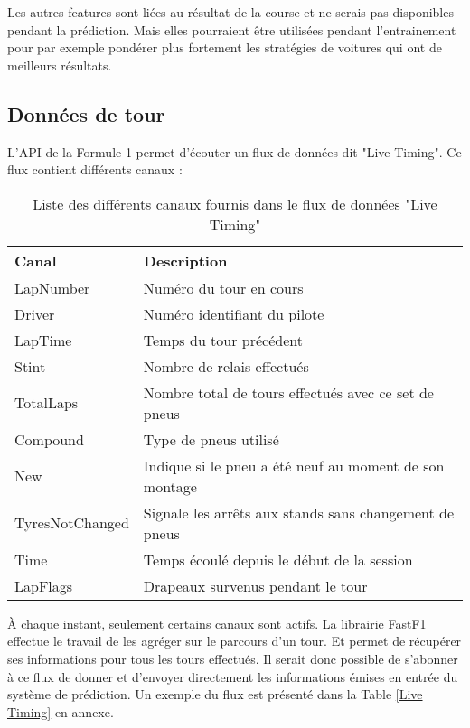 Les autres features sont liées au résultat de la course et ne serais pas disponibles pendant la prédiction.
Mais elles pourraient être utilisées pendant l'entrainement pour par exemple pondérer plus fortement
les stratégies de voitures qui ont de meilleurs résultats.
\subsection{Données de tour}
L'API de la Formule 1 permet d'écouter un flux de données dit "Live Timing".
Ce flux contient différents canaux :
\begin{table}[H]
    \begin{center}
        \caption{Liste des différents canaux fournis dans le flux de données "Live Timing" \cite{fastf1documentation}}
        \begin{tabular}{l|l}
            Canal           & Description                                            \\ \hline
            LapNumber       & Numéro du tour en cours                                \\
            Driver          & Numéro identifiant du pilote                           \\
            LapTime         & Temps du tour précédent                                \\
            Stint           & Nombre de relais effectués                             \\
            TotalLaps       & Nombre total de tours effectués avec ce set de pneus   \\
            Compound        & Type de pneus utilisé                                  \\
            New             & Indique si le pneu a été neuf au moment de son montage \\
            TyresNotChanged & Signale les arrêts aux stands sans changement de pneus \\
            Time            & Temps écoulé depuis le début de la session             \\
            LapFlags        & Drapeaux survenus pendant le tour
        \end{tabular}
    \end{center}
\end{table}

À chaque instant, seulement certains canaux sont actifs. La librairie FastF1 effectue le travail de les agréger sur le parcours d'un tour. Et permet de récupérer ses informations pour tous les tours effectués.
Il serait donc possible de s'abonner à ce flux de donner et d'envoyer directement les informations
émises en entrée du système de prédiction. Un exemple du flux est présenté dans la Table \ref{Live Timing} en annexe.

